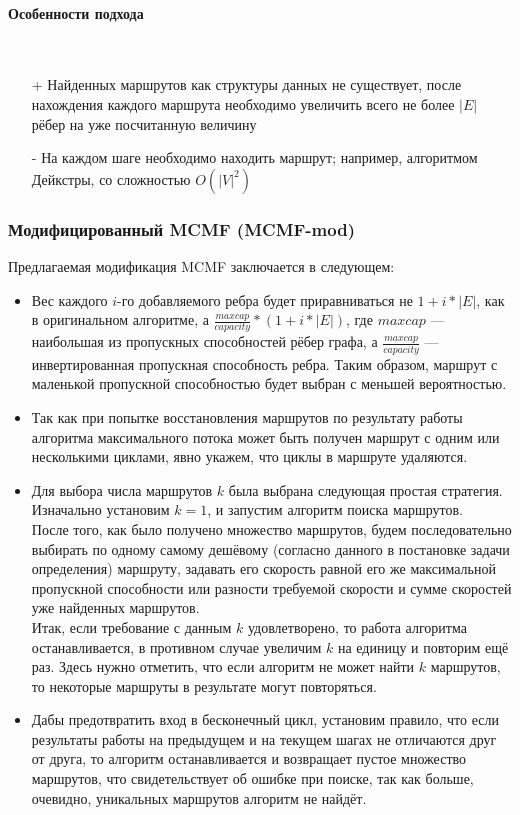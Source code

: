 \documentclass[a4paper]{article}
\begin{document}
\paragraph{Особенности подхода}\mbox{}\\
\begin{itemize}
\item[+] Найденных маршрутов как структуры данных не существует, после нахождения каждого маршрута необходимо увеличить всего не более $|E|$ рёбер на уже посчитанную величину
\item[-] На каждом шаге необходимо находить маршрут; например, алгоритмом Дейкстры, со сложностью $O(|V|^2)$
\end{itemize}

\subsubsection{Модифицированный MCMF (MCMF-mod)} \label{mcmfmod}
Предлагаемая модификация MCMF заключается в следующем:
\begin{itemize}
\item Вес каждого $i$-го добавляемого ребра будет приравниваться не $1+i*|E|$, как в оригинальном алгоритме, а $\frac{maxcap}{capacity} * (1+i*|E|)$, где $maxcap$ --- наибольшая из пропускных способностей рёбер графа, а $\frac{maxcap}{capacity}$  --- инвертированная пропускная способность ребра. Таким образом, маршрут с маленькой пропускной способностью будет выбран с меньшей вероятностью.
\item Так как при попытке восстановления маршрутов по результату работы алгоритма максимального потока может быть получен маршрут с одним или несколькими циклами, явно укажем, что циклы в маршруте удаляются.
\item Для выбора числа маршрутов $k$ была выбрана следующая простая стратегия. Изначально установим $k=1$, и запустим алгоритм поиска маршрутов.\\
После того, как было получено множество маршрутов, будем последовательно выбирать по одному самому дешёвому (согласно данного в постановке задачи определения) маршруту, задавать его скорость равной его же максимальной пропускной способности или разности требуемой скорости и сумме скоростей уже найденных маршрутов.\\
Итак, если требование с данным $k$ удовлетворено, то работа алгоритма останавливается, в противном случае увеличим $k$ на единицу и повторим ещё раз.
Здесь нужно отметить, что если алгоритм не может найти $k$ маршрутов, то некоторые маршруты в результате могут повторяться.
\item Дабы предотвратить вход в бесконечный цикл, установим правило, что если результаты работы на предыдущем и на текущем шагах не отличаются друг от друга, то алгоритм останавливается и возвращает пустое множество маршрутов, что свидетельствует об ошибке при поиске, так как больше, очевидно, уникальных маршрутов алгоритм не найдёт.
\end{itemize}
\end{document}
